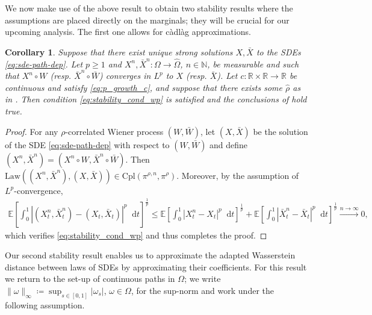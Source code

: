 \documentclass[oneside]{amsart}
\newtheorem{corollary}[theorem]{Corollary}
\theoremstyle{definition}
\newcommand{\N}{\mathbb N}
\newcommand{\cpl}{\mathrm{Cpl}}
\newcommand{\dt}{\mathop{}\!\mathrm{d}t}
\def\E{{\mathbb E}}
\numberwithin{equation}{section}
\begin{document}
We now make use of the above result to obtain two stability results where the assumptions are placed directly on the marginals; they will be crucial for our upcoming analysis. The first one allows for c{\`a}dl{\`a}g approximations. 

\begin{corollary}\label{rem:suff_cond_stab_lp}
	Suppose that there exist unique strong solutions $X,\bar X$ to the SDEs \eqref{eq:sde-path-dep}. Let $p\ge 1$ and $X^n,\bar X^n \colon \Omega\to\hat\Omega$, $n\in\N$, be measurable and such that $X^n\circ W$ (resp. $\bar X^n\circ \bar W$) converges in $L^p$ to $X$ (resp. $\bar X$). Let $c \colon \mathbb R\times \mathbb R \to\mathbb R$ be continuous and satisfy \eqref{eq:p_growth_c}, and suppose that there exists some $\hat\rho$ as in . Then condition \eqref{eq:stability_cond_wp} is satisfied and the conclusions of  hold true. 
\end{corollary}
 	
\begin{proof}
	For any $\rho$-correlated Wiener process $(W,\bar W)$,  let $(X,\bar X)$ be the solution of the SDE \eqref{eq:sde-path-dep} with respect to $(W,\bar W)$ and define $(X^n,\bar X^n)=(X^n\circ W,\bar X^n\circ \bar W)$. Then $\mathrm{Law}((X^n,\bar X^n),(X,\bar X))\in\cpl(\pi^{\rho,n},\pi^\rho)$. Moreover, by the assumption of $L^p$-convergence,
    \begin{align}
        \E\!\left[\int_0^1|(X^n_t,\bar X^n_t)-(X_t,\bar X_t)|^p\dt\right]^\frac{1}{p}
        \le \E\!\left[\int_0^1|X^n_t-X_t|^p\dt\right]^\frac{1}{p}+\E\!\left[\int_0^1|\bar X^n_t-\bar X_t|^p\dt\right]^\frac{1}{p}
        \xrightarrow{n\to\infty}0,
    \end{align} 
    which verifies \eqref{eq:stability_cond_wp} and thus completes the proof. 
\end{proof}

Our second stability result enables us to approximate the adapted Wasserstein distance between laws of SDEs by approximating their coefficients. For this result we return to the set-up of continuous paths in $\Omega$; we write $\|\omega\|_\infty \coloneqq  \sup_{s\in[0,1]}|\omega_s|$, $\omega\in \Omega$, for the sup-norm and work under the following assumption.
\end{document}
